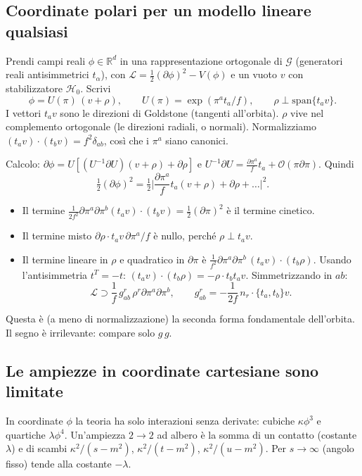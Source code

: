 \documentclass[11pt,a4paper]{article}
\numberwithin{equation}{section}
\theoremstyle{remark}
\newcommand{\G}{\mathcal{G}}
\newcommand{\Hg}{\mathcal{H}_0}
\newcommand{\R}{\mathbb{R}}
\begin{document}
\subsection{Coordinate polari per un modello lineare qualsiasi}

Prendi campi reali $\phi\in\R^{d}$ in una rappresentazione ortogonale di $\G$ (generatori reali antisimmetrici $t_\alpha$), con $\mathcal L=\frac12(\partial\phi)^2-V(\phi)$ e un vuoto $v$ con stabilizzatore $\Hg$. Scrivi
\[
\phi=U(\pi)\,(v+\rho),\qquad U(\pi)=\exp(\pi^at_a/f),\qquad \rho\perp\mathrm{span}\{t_av\}.
\]
I vettori $t_av$ sono le direzioni di Goldstone (tangenti all'orbita). $\rho$ vive nel complemento ortogonale (le direzioni radiali, o normali). Normalizziamo $(t_av)\cdot(t_bv)=f^2\delta_{ab}$, così che i $\pi^a$ siano canonici.

Calcolo: $\partial\phi=U[(U^{-1}\partial U)(v+\rho)+\partial\rho]$ e $U^{-1}\partial U=\frac{\partial\pi^a}{f}t_a+\mathcal O(\pi\partial\pi)$. Quindi
\[
\tfrac12(\partial\phi)^2=\tfrac12\Big|\frac{\partial\pi^a}{f}t_a(v+\rho)+\partial\rho+\dots\Big|^2 .
\]
\begin{itemize}
\item Il termine $\frac{1}{2f^2}\partial\pi^a\partial\pi^b(t_av)\cdot(t_bv)=\frac12(\partial\pi)^2$ è il termine cinetico.
\item Il termine misto $\partial\rho\cdot t_av\,\partial\pi^a/f$ è nullo, perché $\rho\perp t_av$.
\item Il termine lineare in $\rho$ e quadratico in $\partial\pi$ è $\frac{1}{f^2}\partial\pi^a\partial\pi^b\,(t_av)\cdot(t_b\rho)$. Usando l'antisimmetria $t^T=-t$: $(t_av)\cdot(t_b\rho)=-\rho\cdot t_bt_av$. Simmetrizzando in $ab$:
\begin{equation}
\mathcal L\supset\frac1f\,g^r_{ab}\,\rho^r\partial\pi^a\partial\pi^b,\qquad g^r_{ab}=-\frac{1}{2f}\,n_r\cdot\{t_a,t_b\}v .
\label{eq:gr}
\end{equation}
\end{itemize}
Questa è (a meno di normalizzazione) la seconda forma fondamentale dell'orbita. Il segno è irrilevante: compare solo $g\,g$.

\subsection{Le ampiezze in coordinate cartesiane sono limitate}

In coordinate $\phi$ la teoria ha solo interazioni senza derivate: cubiche $\kappa\phi^3$ e quartiche $\lambda\phi^4$. Un'ampiezza $2\to2$ ad albero è la somma di un contatto (costante $\lambda$) e di scambi $\kappa^2/(s-m^2)$, $\kappa^2/(t-m^2)$, $\kappa^2/(u-m^2)$. Per $s\to\infty$ (angolo fisso) tende alla costante $-\lambda$.
\end{document}
